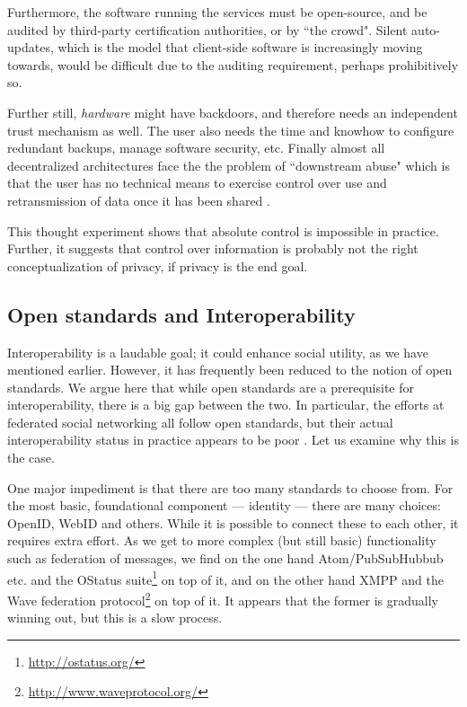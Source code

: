 \documentclass{acm_proc_article-sp}
\begin{document}
Furthermore, the software running the services must be open-source, and be audited by third-party certification authorities, or by ``the crowd". Silent auto-updates, which is the model that client-side software is increasingly moving towards, would be difficult due to the auditing requirement, perhaps prohibitively so.

Further still, {\em hardware} might have backdoors, and therefore needs an independent trust mechanism as well. The user also needs the time and knowhow to configure redundant backups, manage software security, etc. Finally almost all decentralized architectures face the the problem of ``downstream abuse" which is that the user has no technical means to exercise control over use and retransmission of data once it has been shared \cite{privacyproperty}. 

This thought experiment shows that absolute control is impossible in practice. Further, it suggests that control over information is probably not the right conceptualization of privacy, if privacy is the end goal.

\subsection{Open standards and Interoperability}
\label{sec:openstandards}
Interoperability is a laudable goal; it could enhance social utility, as we have mentioned earlier. However, it has frequently been reduced to the notion of open standards. We argue here that while open standards are a prerequisite for interoperability, there is a big gap between the two. In particular, the efforts at federated social networking all follow open standards, but their actual interoperability status in practice appears to be poor \cite{SWAT0}. Let us examine why this is the case.

One major impediment is that there are too many standards to choose from. For the most basic, foundational component --- identity --- there are many choices: OpenID, WebID and others. While it is possible to connect these to each other, it requires extra effort.  As we get to more complex (but still basic) functionality such as federation of messages, we find on the one hand Atom/PubSubHubbub etc. and the OStatus suite\footnote{\url{http://ostatus.org/}} on top of it, and on the other hand XMPP and the Wave federation protocol\footnote{\url{http://www.waveprotocol.org/}} on top of it. It appears that the former is gradually winning out, but this is a slow process.
\end{document}
